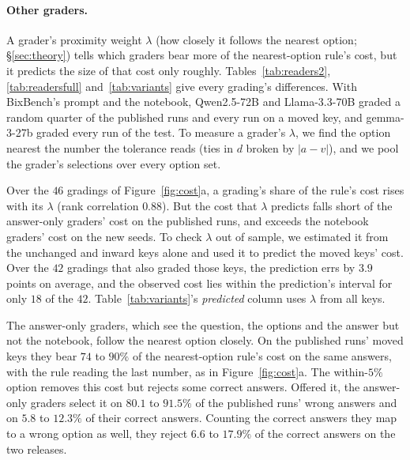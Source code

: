 \documentclass{article}
\begin{document}
\paragraph{Other graders.} A grader's proximity weight $\lambda$ (how closely it follows the nearest option;
\S\ref{sec:theory}) tells which graders bear more of the nearest-option rule's cost, but it predicts the size of that
cost only roughly. Tables~\ref{tab:readers2}, \ref{tab:readersfull} and~\ref{tab:variants} give every grading's
differences. With BixBench's prompt and the notebook, Qwen2.5-72B and Llama-3.3-70B graded a random quarter of the
published runs and every run on a moved key, and gemma-3-27b graded every run of the test. To measure a grader's
$\lambda$, we find the option nearest the number the tolerance reads (ties in $d$ broken by $|a-v|$), and we pool the
grader's selections over every option set.

Over the $46$ gradings of Figure~\ref{fig:cost}a, a grading's share of the rule's cost rises with its $\lambda$ (rank
correlation $0.88$). But the cost that $\lambda$ predicts falls short of the answer-only graders' cost on the
published runs, and exceeds the notebook graders' cost on the new seeds. To check $\lambda$ out of sample, we
estimated it from the unchanged and inward keys alone and used it to predict the moved keys' cost. Over the $42$
gradings that also graded those keys, the prediction errs by $3.9$ points on average, and the observed cost lies
within the prediction's interval for only $18$ of the $42$. Table~\ref{tab:variants}'s \emph{predicted} column uses
$\lambda$ from all keys.

The answer-only graders, which see the question, the options and the answer but not the notebook, follow the nearest
option closely. On the published runs' moved keys they bear $74$ to $90\%$ of the nearest-option rule's cost on the same
answers, with the rule reading the last number, as in Figure~\ref{fig:cost}a. The within-$5\%$ option removes this cost but rejects some correct
answers. Offered it, the answer-only graders select it on $80.1$ to $91.5\%$ of the published runs' wrong answers and
on $5.8$ to $12.3\%$ of their correct answers. Counting the correct answers they map to a wrong option as well, they
reject $6.6$ to $17.9\%$ of the correct answers on the two releases.
\end{document}
